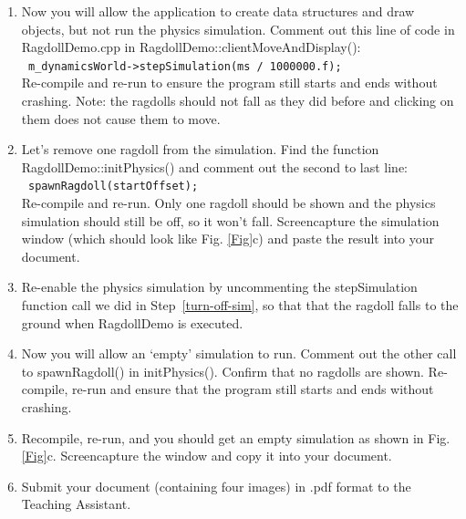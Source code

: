 \documentclass[12pt]{article}
\begin{document}
\begin{enumerate}
\item \label{turn-off-sim} Now you will allow the application to create data structures and draw objects, but not run the physics simulation.  Comment out this line of code in RagdollDemo.cpp in RagdollDemo::clientMoveAndDisplay(): \\
\texttt{ m\_dynamicsWorld->stepSimulation(ms / 1000000.f);} \\
Re-compile and re-run to ensure the program still starts and ends without crashing.  Note: the ragdolls should not fall as they did before and clicking on them does not cause them to move.

\item Let's remove one ragdoll from the simulation.  Find the function RagdollDemo::initPhysics() and comment out the second to last line: \\
\texttt{	spawnRagdoll(startOffset);} \\
Re-compile and re-run.  Only one ragdoll should be shown and the physics simulation should still be off, so it won't fall.  Screencapture the simulation window (which should look like Fig. \ref{Fig}c) and paste the result into your document.

\item Re-enable the physics simulation by uncommenting the stepSimulation function call we did in Step~\ref{turn-off-sim}, so that that the ragdoll falls to the ground when RagdollDemo is executed.

\item Now you will allow an `empty' simulation to run.  Comment out the other call to spawnRagdoll() in initPhysics().  Confirm that no ragdolls are shown.  Re-compile, re-run and ensure that the program still starts and ends without crashing.

\item Recompile, re-run, and you should get an empty simulation as shown in Fig. \ref{Fig}c. Screencapture the window and copy it into your document.

\item Submit your document (containing four images) in .pdf format to the Teaching Assistant.

\end{enumerate}
\end{document}
